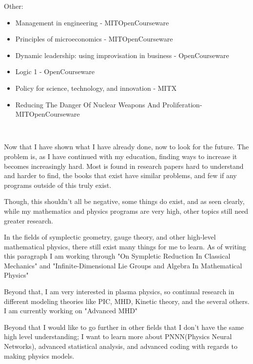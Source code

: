 Other:
\begin{itemize}
    \item Management in engineering - MITOpenCourseware
    \item Principles of microeconomics - MITOpenCourseware
    \item Dynamic leadership: using improvisation in business  - OpenCourseware
    \item Logic 1 - OpenCourseware
    \item Policy for science, technology, and innovation -  MITX
    \item Reducing The Danger Of Nuclear Weapons And Proliferation- MITOpenCourseware

\end{itemize}
\\

\par Now that I have shown what I have already done, now to look for the future. The problem is, as I have continued with my education, finding ways to increase it becomes increasingly hard. Most is found in research papers hard to understand and harder to find, the books that exist have similar problems, and few if any programs outside of this truly exist. 
\par Though, this shouldn't all be negative, some things do exist, and as seen clearly, while my mathematics and physics programs are very high, other topics still need greater research.
\par In the fields of symplectic geometry, gauge theory, and other high-level mathematical physics, there still exist many things for me to learn. As of writing this paragraph I am working through "On Sympletic Reduction In Classical Mechanics" and "Infinite-Dimensional Lie Groups and Algebra In Mathematical Physics"
\par Beyond that, I am very interested in plasma physics, so continual research in different modeling theories like PIC, MHD, Kinetic theory, and the several others. I am currently working on "Advanced MHD"
\par Beyond that I would like to go further in other fields that I don't have the same high level understanding; I want to learn more about PNNN(Physics Neural Networks), advanced statistical analysis, and advanced coding with regards to making physics models. 

